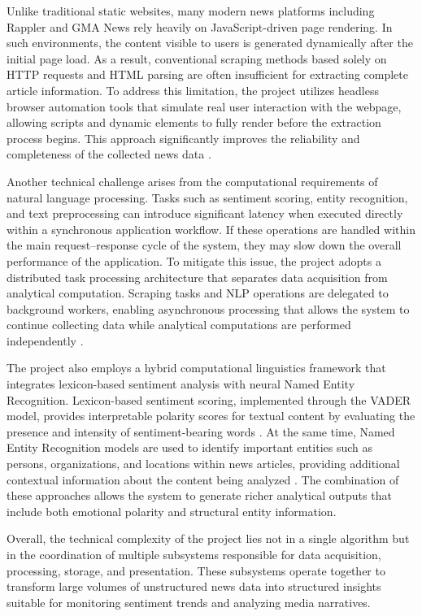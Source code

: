 Unlike traditional static websites, many modern news platforms including Rappler and GMA News rely heavily on JavaScript-driven page rendering. In such environments, the content visible to users is generated dynamically after the initial page load. As a result, conventional scraping methods based solely on HTTP requests and HTML parsing are often insufficient for extracting complete article information. To address this limitation, the project utilizes headless browser automation tools that simulate real user interaction with the webpage, allowing scripts and dynamic elements to fully render before the extraction process begins. This approach significantly improves the reliability and completeness of the collected news data \cite{ref30}.

Another technical challenge arises from the computational requirements of natural language processing. Tasks such as sentiment scoring, entity recognition, and text preprocessing can introduce significant latency when executed directly within a synchronous application workflow. If these operations are handled within the main request--response cycle of the system, they may slow down the overall performance of the application. To mitigate this issue, the project adopts a distributed task processing architecture that separates data acquisition from analytical computation. Scraping tasks and NLP operations are delegated to background workers, enabling asynchronous processing that allows the system to continue collecting data while analytical computations are performed independently \cite{ref29}.

The project also employs a hybrid computational linguistics framework that integrates lexicon-based sentiment analysis with neural Named Entity Recognition. Lexicon-based sentiment scoring, implemented through the VADER model, provides interpretable polarity scores for textual content by evaluating the presence and intensity of sentiment-bearing words \cite{ref08}. At the same time, Named Entity Recognition models are used to identify important entities such as persons, organizations, and locations within news articles, providing additional contextual information about the content being analyzed \cite{ref26}. The combination of these approaches allows the system to generate richer analytical outputs that include both emotional polarity and structural entity information.

Overall, the technical complexity of the project lies not in a single algorithm but in the coordination of multiple subsystems responsible for data acquisition, processing, storage, and presentation. These subsystems operate together to transform large volumes of unstructured news data into structured insights suitable for monitoring sentiment trends and analyzing media narratives.

